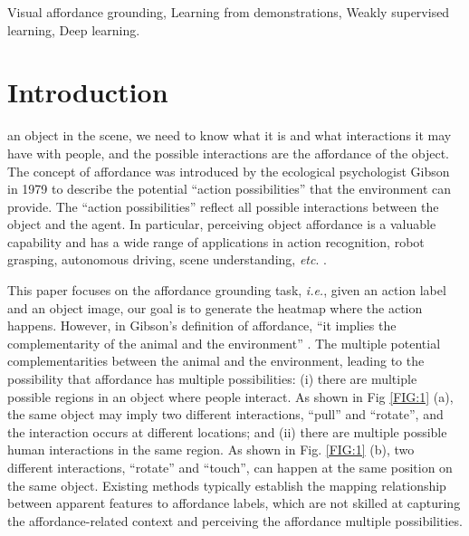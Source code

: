 \documentclass[journal,twoside]{IEEEtran}
\def\ie{\emph{i.e.}}
\def\etc{\emph{etc}}
\begin{document}
\begin{IEEEkeywords}
Visual affordance grounding, Learning from demonstrations, Weakly supervised learning, Deep learning.
\end{IEEEkeywords}

\section{Introduction}

 an object in the scene, we need to know what it is and what interactions it may have with people, and the possible interactions are the affordance of the object. The concept of affordance was introduced by the ecological psychologist Gibson \cite{theaff} in 1979 to describe the potential ``action possibilities'' that the environment can provide. The ``action possibilities'' reflect all possible interactions between the object and the agent. In particular, perceiving object affordance is a valuable capability and has a wide range of applications in action recognition, robot grasping, autonomous driving, scene understanding, \etc. \cite{zhang2020empowering,DBLP:journals/corr/abs-1807-06775,DBLP:journals/cviu/KjellstromRK11,qi2017predicting,vu2014predicting,yamanobe2017brief,liu2019auto}.

This paper focuses on the affordance grounding task, \ie, given an action label and an object image,  our goal is to generate the heatmap where the action happens. However, in Gibson's definition of affordance, ``it implies the complementarity of the animal and the environment'' \cite{theaff}. The multiple potential complementarities between the animal and the environment, leading to the possibility that affordance has multiple possibilities: (i) there are multiple possible regions in an object where people interact. As shown in Fig \ref{FIG:1} (a), the same object may imply two different interactions, ``pull'' and ``rotate'', and the interaction occurs at different locations; and (ii) there are multiple possible human interactions in the same region. As shown in Fig. \ref{FIG:1} (b), two different interactions, ``rotate'' and ``touch'', can happen at the same position on the same object. Existing methods \cite{DBLP:KoppulaS14,DBLP:conf/iros/NguyenKCT17,8460902,DBLP:conf/cvpr/SawatzkySG17} typically establish the mapping relationship between apparent features to affordance labels, which are not skilled at capturing the affordance-related context and perceiving the affordance multiple possibilities.
\end{document}
